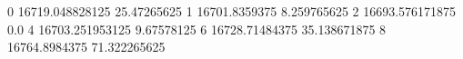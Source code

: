 0 16719.048828125 25.47265625
1 16701.8359375 8.259765625
2 16693.576171875 0.0
4 16703.251953125 9.67578125
6 16728.71484375 35.138671875
8 16764.8984375 71.322265625
